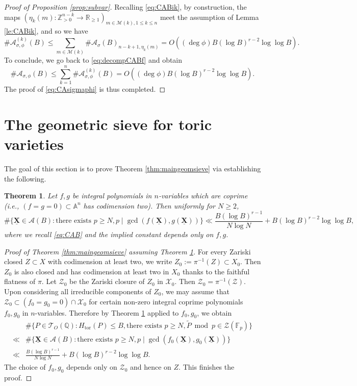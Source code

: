 \documentclass[11pt,letterpaper]{amsart}
\newcommand{\BA}{{\mathbb {A}}}
\newcommand{\BF}{{\mathbb {F}}}
\newcommand{\BQ}{{\mathbb {Q}}}
\newcommand{\BR}{{\mathbb {R}}}
\newcommand{\BZ}{{\mathbb {Z}}}
\newcommand{\CA}{{\mathcal {A}}}
\newcommand{\CM}{{\mathcal {M}}}
\newcommand{\CT}{{\mathcal {T}}}
\newcommand{\CX}{{\mathcal {X}}}
\newcommand{\CZ}{{\mathcal {Z}}}
\newcommand{\XX}{\underline{\mathbf{X}}}
\theoremstyle{plain}
\numberwithin{equation}{section}
\newtheorem{theorem}{Theorem}[section]
\theoremstyle{definition}
\theoremstyle{remark}
\begin{document}
\begin{proof}[Proof of Proposition \ref{prop:subvar}]
	Recalling \eqref{eq:CABik}, by construction, the maps $(\eta_{k}(m):\BZ_{>0}^{n-k}\to\BR_{\geqslant 1})_{m\in \CM(k),1\leqslant k\leqslant n}$ meet the assumption of Lemma \ref{le:CABik}, and so we have $$\#\CA_{\sigma,\phi}^{(k)}(B)\leqslant \sum_{m\in\CM(k)} \#\CA_\sigma(B)_{n-k+1,\eta_k(m)}=O\left((\deg \phi)B(\log B)^{r-2}\log\log B\right).$$
	To conclude, we go back to \eqref{eq:decompCABf} and obtain
	$$\#\CA_{\sigma,\phi}(B)\leqslant \sum_{k=1}^{n}\#\CA_{\sigma,\phi}^{(k)}(B)=O\left((\deg \phi)B(\log B)^{r-2}\log\log B\right).$$
	The proof of \eqref{eq:CAsigmaphi} is thus completed.
\end{proof}

\section{The geometric sieve for toric varieties}\label{se:geomsieve}
The goal of this section is to prove Theorem \ref{thm:maingeomsieve} via establishing the following.
\begin{theorem}\label{thm:geomsieve1}
	Let $f,g$ be integral polynomials in $n$-variables which are coprime (i.e., $(f=g=0)\subset\BA^{n}$ has codimension two). Then uniformly for $N\geqslant 2$,
		$$\#\{\XX\in\CA(B): \text{there exists } p\geqslant N,p\mid \gcd(f(\XX),g(\XX))\}\ll \frac{B(\log B)^{r-1}}{N\log N}+B(\log B)^{r-2}\log\log B,$$ where we recall \eqref{eq:CAB} and the implied constant depends only on $f,g$.
\end{theorem}
\begin{proof}[Proof of Theorem \ref{thm:maingeomsieve} assuming Theorem \ref{thm:geomsieve1}]
 For every Zariski closed $Z\subset X$ with codimension at least two, we write $Z_0:=\pi^{-1}(Z)\subset X_0$. Then $Z_0$ is also closed and has codimension at least two in $X_0$ thanks to the faithful flatness of $\pi$. Let $\CZ_0$ be the Zariski closure of $Z_0$ in $\CX_0$. Then $\CZ_0=\pi^{-1}(\CZ)$. 
Upon considering all irreducible components of $Z_0$, we may assume that $\CZ_0\subset (f_0=g_0=0)\cap \CX_0$ for certain non-zero integral coprime polynomials $f_0,g_0$ in $n$-variables.  Therefore by Theorem \ref{thm:geomsieve1} applied to $f_0,g_0$, we obtain
\begin{align*}
	&\#\{P\in \CT_{O}(\BQ):H_{\operatorname{tor}}(P)\leqslant B, \text{there exists } p\geqslant N,\widetilde{P}\bmod p \in\CZ(\BF_p)\}\\ \ll&\#\{\XX\in\CA(B): \text{there exists } p\geqslant N,p\mid \gcd(f_0(\XX),g_0(\XX))\}\\ \ll& \frac{B(\log B)^{r-1}}{N\log N}+B(\log B)^{r-2}\log\log B.
\end{align*}
The choice of $f_0,g_0$ depends only on $\CZ_0$ and hence on $Z$. This finishes the proof.
\end{proof}
\end{document}
